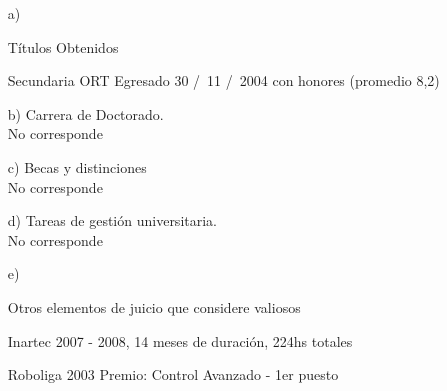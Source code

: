 \begin{enumerate}[leftmargin=0.8cm]

  \item[a)]{Títulos Obtenidos

    \begin{itemize}[leftmargin=0.2cm]

      {Secundaria ORT}
      {Egresado 30 \slash \ 11 \slash \ 2004 con honores (promedio 8,2)}

    \end{itemize}

  }

  \item[b)]{Carrera de Doctorado.
    \\No corresponde
  }

  \item[c)]{Becas y distinciones
    \\No corresponde
  }

  \item[d)]{Tareas de gestión universitaria.
    \\No corresponde
  }

  \item[e)]{Otros elementos de juicio que considere valiosos

    \begin{itemize}[leftmargin=0.2cm]

      {Inartec}
      {2007 - 2008, 14 meses de duración, 224hs totales}{}

      {Roboliga 2003}
      {Premio: Control Avanzado - 1er puesto}{}

    \end{itemize}

  }

\end{enumerate}
